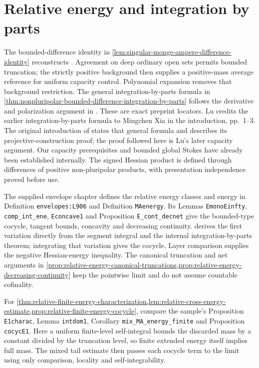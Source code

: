 \section{Relative energy and integration by parts}\label{sec:history-energy}
The bounded-difference identity in \cref{lem:singular-monge-ampere-difference-identity} reconstructs \cite[Lemma 4.1, pp.~13--15]{Lu2020v1}. Agreement on deep ordinary open sets permits bounded truncation; the strictly positive background then supplies a positive-mass average reference for uniform capacity control. Polynomial expansion removes that background restriction. The general integration-by-parts formula in \cref{thm:nonpluripolar-bounded-difference-integration-by-parts} follows the derivative and polarization argument in \cite[Proof of Theorem 1.2, pp.~15--16]{Lu2020v1}. These are exact preprint locators. Lu credits the earlier integration-by-parts formula to Mingchen Xia in the introduction, pp.~1--3. The original introduction of \cite[Theorem 1.1 and discussion, pp.~1--2]{Xia2019v1} states that general formula and describes its projective-construction proof; the proof followed here is Lu's later capacity argument. Our capacity prerequisites and bounded global Stokes have already been established internally. The signed Hessian product is defined through differences of positive non-pluripolar products, with presentation independence proved before use.

The supplied envelope chapter \cite{XiaSampleBook} defines the relative energy classes and energy in Definition \texttt{envelopes:L906} and Definition \texttt{MAenergy}. Its Lemmas \texttt{EmonoEinfty}, \texttt{comp\_int\_ene}, \texttt{Econcave1} and Proposition \texttt{E\_cont\_decnet} give the bounded-type cocycle, tangent bounds, concavity and decreasing continuity.  derives the first variation directly from the segment integral and the internal integration-by-parts theorem; integrating that variation gives the cocycle. Layer comparison supplies the negative Hessian-energy inequality. The canonical truncation and net arguments in \cref{prop:relative-energy-canonical-truncations,prop:relative-energy-decreasing-continuity} keep the pointwise limit and do not assume countable cofinality.

For \cref{thm:relative-finite-energy-characterization,lem:relative-cross-energy-estimate,prop:relative-finite-energy-cocycle}, compare the sample's Proposition \texttt{E1charac}, Lemma \texttt{intdom1}, Corollary \texttt{mix\_MA\_energy\_finite} and Proposition \texttt{cocycE1}. Here a uniform finite-level self-integral bounds the discarded mass by a constant divided by the truncation level, so finite extended energy itself implies full mass. The mixed tail estimate then passes each cocycle term to the limit using only comparison, locality and self-integrability.


